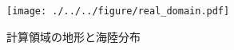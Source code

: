 \begin{figure}[tb]
\begin{center}
  \texttt{[image: ./../../figure/real\_domain.pdf]}\\
  \caption{計算領域の地形と海陸分布}
  \label{fig:tutorial_real_domain}
\end{center}
\end{figure}
